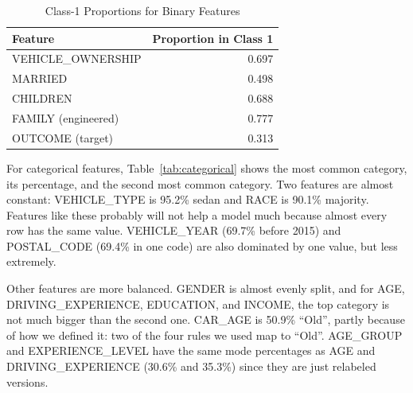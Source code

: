 \documentclass[conference]{IEEEtran}
\begin{document}
\begin{table}[t]
\caption{Class-1 Proportions for Binary Features}
\label{tab:binary}
\centering
\begin{tabular}{@{}lr@{}}
\toprule
\textbf{Feature} & \textbf{Proportion in Class 1} \\
\midrule
VEHICLE\_OWNERSHIP     & 0.697 \\
MARRIED                & 0.498 \\
CHILDREN               & 0.688 \\
FAMILY (engineered)    & 0.777 \\
\midrule
OUTCOME (target)   & 0.313 \\
\bottomrule
\end{tabular}
\end{table}

For categorical features, Table~\ref{tab:categorical} shows the most common category, its percentage, and the second 
most common category. Two features are almost constant: VEHICLE\_TYPE is 95.2\% sedan and RACE is 
90.1\% majority. Features like these probably will not help a model much because almost every row has the same value. 
VEHICLE\_YEAR (69.7\% before 2015) and POSTAL\_CODE (69.4\% in one code) are also dominated by one 
value, but less extremely.
 
Other features are more balanced. GENDER is almost evenly split, and for AGE, 
DRIVING\_EXPERIENCE, EDUCATION, and INCOME, the top category is not much bigger than the 
second one. CAR\_AGE is 50.9\% ``Old'', partly because of how we defined it: two of the four rules we used 
map to ``Old''. AGE\_GROUP and EXPERIENCE\_LEVEL have the same mode percentages as AGE and 
DRIVING\_EXPERIENCE (30.6\% and 35.3\%) since they are just relabeled versions.
 
\end{document}
